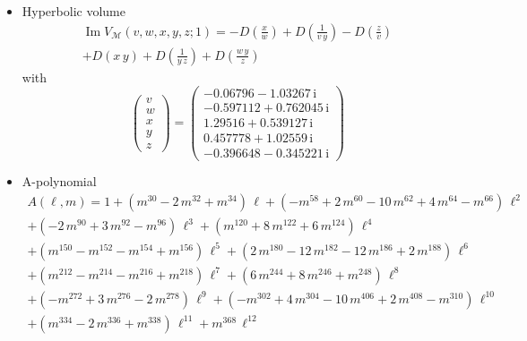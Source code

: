\documentclass[12pt,reqno]{amsart}
\numberwithin{equation}{section}
\renewcommand{\Im}{\operatorname{Im}}
\newcommand{\I}{\mathrm{i}}
\begin{document}
\begin{itemize}
\item Hyperbolic volume
  \begin{multline*}
    \Im V_{\mathcal{M}}(v,w, x, y,z ; 1)
    =
    -D\left(\frac{x}{w}\right)
    + D\left(\frac{1}{v  \, y}\right)
    - D\left(\frac{z}{v }\right)
    \\
    + D\left( x \, y \right)
    + D \left( \frac{1}{y \, z}\right)
    + D\left(\frac{w \, y}{z}\right)
  \end{multline*}
  with
  \begin{equation*}
    \begin{pmatrix}
      v \\ w\\ x\\ y \\ z
    \end{pmatrix}
    =
    \begin{pmatrix}
      -0.06796 - 1.03267 \, \I
      \\
      -0.597112 + 0.762045  \, \I
      \\
      1.29516  +  0.539127 \, \I
      \\
      0.457778 +  1.02559 \, \I
      \\
      -0.396648 - 0.345221 \, \I
    \end{pmatrix}
  \end{equation*}
\item A-polynomial
  \begin{multline*}
    A(\ell, m )
    =
    1 + ( m^{30} - 2 \, m^{32} + m^{34} ) \,\ell
    + ( -m^{58} + 2 \, m^{60} - 10 \, m^{62} + 4 \, m^{64} - m^{66})
    \, \ell^2
    \\
    +(-2 \, m^{90} + 3 \, m^{92} - m^{96}) \, \ell^3 
    + (m^{120} + 8 \, m^{122} + 6 \, m^{124})  \,\ell^4
    \\
    +(m^{150} - m^{152} - m^{154} + m^{156}) \,  \ell^5
    +
    (2 \, m^{180} - 12 \,  m^{182} - 12 \, m^{186} + 2 \, m^{188})  \,
    \ell^6
    \\
    +(m^{212} - m^{214} - m^{216} + m^{218}) \, \ell^7
    +(6 \,  m^{244} + 8 \, m^{246} + m^{248}) \, \ell^8
    \\
    +(-m^{272} + 3 \,  m^{276} - 2 \, m^{278})  \, \ell^9
    +(-m^{302} + 4 \,  m^{304} - 10 \, m^{406} + 2 \, m^{408} -
    m^{310}) \,  \ell^{10}
    \\
    +(m^{334} - 2 \, m^{336} + m^{338})\, \ell^{11}
    + m^{368}  \, \ell^{12}    
  \end{multline*}
\end{itemize}
\end{document}
